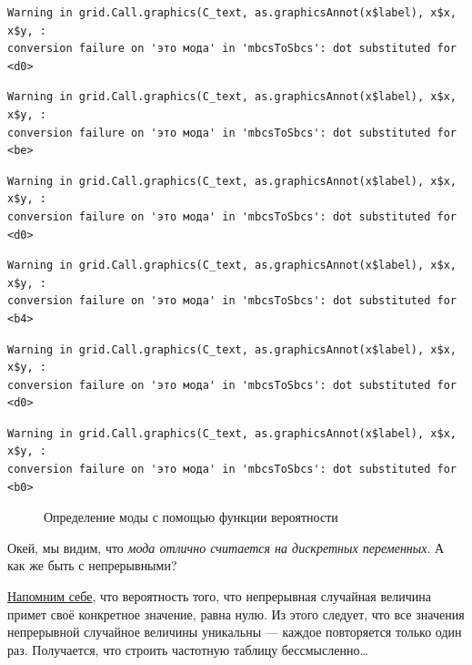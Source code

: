\documentclass[
  letterpaper,
]{scrbook}
\theoremstyle{definition}
\theoremstyle{remark}
\begin{document}
\begin{verbatim}
Warning in grid.Call.graphics(C_text, as.graphicsAnnot(x$label), x$x, x$y, :
conversion failure on 'это мода' in 'mbcsToSbcs': dot substituted for <d0>
\end{verbatim}

\begin{verbatim}
Warning in grid.Call.graphics(C_text, as.graphicsAnnot(x$label), x$x, x$y, :
conversion failure on 'это мода' in 'mbcsToSbcs': dot substituted for <be>
\end{verbatim}

\begin{verbatim}
Warning in grid.Call.graphics(C_text, as.graphicsAnnot(x$label), x$x, x$y, :
conversion failure on 'это мода' in 'mbcsToSbcs': dot substituted for <d0>
\end{verbatim}

\begin{verbatim}
Warning in grid.Call.graphics(C_text, as.graphicsAnnot(x$label), x$x, x$y, :
conversion failure on 'это мода' in 'mbcsToSbcs': dot substituted for <b4>
\end{verbatim}

\begin{verbatim}
Warning in grid.Call.graphics(C_text, as.graphicsAnnot(x$label), x$x, x$y, :
conversion failure on 'это мода' in 'mbcsToSbcs': dot substituted for <d0>
\end{verbatim}

\begin{verbatim}
Warning in grid.Call.graphics(C_text, as.graphicsAnnot(x$label), x$x, x$y, :
conversion failure on 'это мода' in 'mbcsToSbcs': dot substituted for <b0>
\end{verbatim}

\begin{figure}


\caption{\label{fig-mode-pmf}Определение моды с помощью функции
вероятности}

\end{figure}%

Окей, мы видим, что \emph{мода отлично считается на дискретных
переменных}. А как же быть с непрерывными?

\href{}{Напомним себе}, что вероятность того, что непрерывная случайная
величина примет своё конкретное значение, равна нулю. Из этого следует,
что все значения непрерывной случайное величины уникальны --- каждое
повторяется только один раз. Получается, что строить частотную таблицу
бессмысленно\ldots{}
\end{document}
